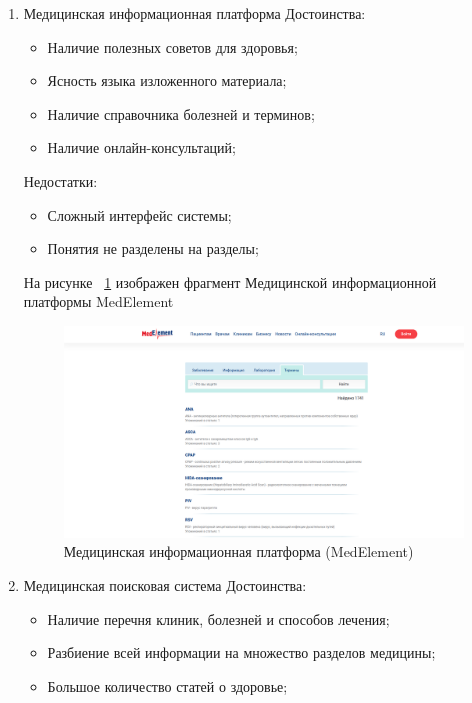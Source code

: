 \begin{enumerate}
	\item{
		Медицинская информационная платформа \cite{medelement}
		\newline
		Достоинства:
		\begin{itemize}
			\item{Наличие полезных советов для здоровья;}
			\item{Ясность языка изложенного материала;}
			\item{Наличие справочника болезней и терминов;}
			\item{Наличие онлайн-консультаций;}
		\end{itemize}
		Недостатки:
		\begin{itemize}
			\item {Сложный интерфейс системы;}
			\item {Понятия не разделены на разделы;}\\
		\end{itemize}
		На рисунке ~\ref{fig:sections/medelement} изображен фрагмент Медицинской информационной платформы MedElement
    \begin{figure}[H]
    	\centering
    	\includegraphics[width=1.0\textwidth]{sections/medelement}
    	\caption{Медицинская информационная платформа  (MedElement)}
     	\label{fig:sections/medelement}
    \end{figure} } 
	\item{
		Медицинская поисковая система \cite{medportal}
		\newline
		Достоинства:
		\begin{itemize}
			\item{Наличие перечня клиник, болезней и способов лечения;}
			\item{Разбиение всей информации на множество разделов медицины;}
			\item{Большое количество статей о здоровье;}

\end{itemize}}
\end{enumerate}
